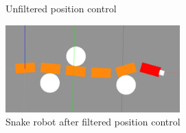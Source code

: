 \begin{figure}
    \centering
    
    \hfil

    \caption{Unfiltered position control}
    \label{fig:singlepos-nofilter}
\end{figure}

\begin{figure}
    \centering
    \includegraphics[width=0.6\textwidth]{figures/experiments/single_pos/gazebo_single_pos.png}
    \caption{Snake robot after filtered position control}
    \label{fig:singlepos-gazebo}
\end{figure}

